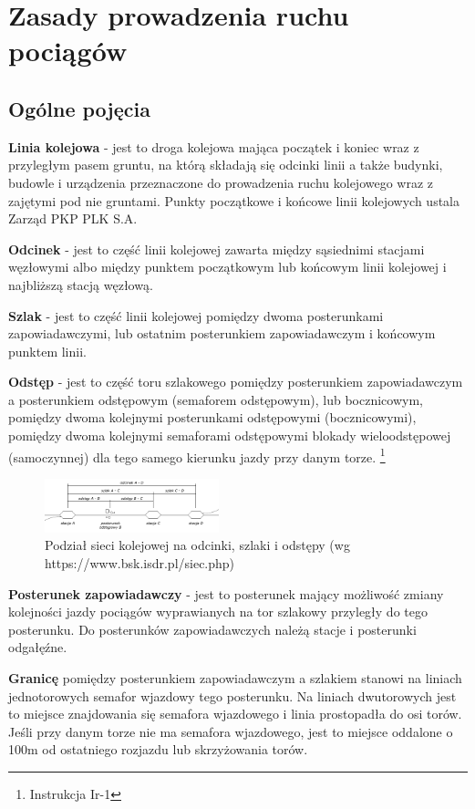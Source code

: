 \chapter{Zasady prowadzenia ruchu pociągów}
\section{Ogólne pojęcia}

\textbf{Linia kolejowa} - jest to droga kolejowa mająca początek i koniec wraz z przyległym pasem gruntu, na którą składają się odcinki linii a także budynki, budowle i urządzenia przeznaczone do prowadzenia ruchu kolejowego wraz z zajętymi pod nie gruntami. Punkty początkowe i końcowe linii kolejowych ustala Zarząd PKP PLK S.A.

\textbf{Odcinek} - jest to część linii kolejowej zawarta między sąsiednimi stacjami węzłowymi albo między punktem początkowym lub końcowym linii kolejowej i najbliższą stacją węzłową.

\textbf{Szlak} - jest to część linii kolejowej pomiędzy dwoma posterunkami zapowiadawczymi, lub ostatnim posterunkiem zapowiadawczym i końcowym punktem linii. 

\textbf{Odstęp} - jest to część toru szlakowego pomiędzy posterunkiem zapowiadawczym a posterunkiem odstępowym (semaforem odstępowym), lub bocznicowym, pomiędzy dwoma kolejnymi posterunkami odstępowymi (bocznicowymi), pomiędzy dwoma kolejnymi semaforami odstępowymi blokady wieloodstępowej (samoczynnej) dla tego samego kierunku jazdy przy danym torze.
\footnote{Instrukcja Ir-1}

	\begin{figure}
		\includegraphics[width=0.45\textwidth]{skryptkierownik-img/skryptkierownik-img001.png}
		\caption{Podział sieci kolejowej na odcinki, szlaki i odstępy (wg https://www.bsk.isdr.pl/siec.php)}
		\label{fig:siec}
	\end{figure}


\textbf{Posterunek zapowiadawczy} - jest to posterunek mający możliwość zmiany kolejności jazdy pociągów wyprawianych na tor szlakowy przyległy do tego posterunku. Do posterunków zapowiadawczych należą stacje i posterunki odgałęźne.

\textbf{Granicę} pomiędzy posterunkiem zapowiadawczym a szlakiem stanowi na liniach jednotorowych semafor wjazdowy tego posterunku. Na liniach dwutorowych jest to miejsce znajdowania się semafora wjazdowego i linia prostopadła do osi torów. Jeśli przy danym torze nie ma semafora wjazdowego, jest to miejsce oddalone o 100m od ostatniego rozjazdu lub skrzyżowania torów.

